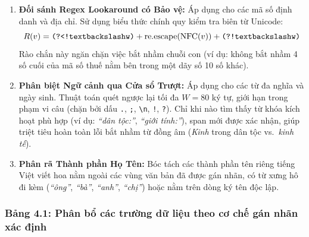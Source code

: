 \documentclass[
  11pt,
  a4paper,
]{article}
\providecommand{\tightlist}{%
  \setlength{\itemsep}{0pt}\setlength{\parskip}{0pt}}
\begin{document}
\begin{enumerate}
\def\labelenumi{\arabic{enumi}.}
\tightlist
\item
  \textbf{Đối sánh Regex Lookaround có Bảo vệ:} Áp dụng cho các mã số định danh và địa chỉ. Sử dụng
  biểu thức chính quy kiểm tra biên từ Unicode:
  \[R(v) = \texttt{(?<!\\textbackslash{}w)} + \text{re.escape}(\text{NFC}(v)) + \texttt{(?!\\textbackslash{}w)}\]
  Rào chắn này ngăn chặn việc bắt nhầm chuỗi con (ví dụ: không bắt nhầm 4 số cuối của mã số thuế nằm
  bên trong một dãy số 10 số khác).
\item
  \textbf{Phân biệt Ngữ cảnh qua Cửa sổ Trượt:} Áp dụng cho các từ đa nghĩa và ngày sinh. Thuật toán
  quét ngược lại tối đa \(W = 80\) ký tự, giới hạn trong phạm vi câu (chặn bởi dấu \texttt{.},
  \texttt{;}, \texttt{\textbackslash{}n}, \texttt{!}, \texttt{?}). Chỉ khi nào tìm thấy từ khóa kích
  hoạt phù hợp (ví dụ: \emph{``dân tộc:''}, \emph{``giới tính:''}), span mới được xác nhận, giúp
  triệt tiêu hoàn toàn lỗi bắt nhầm từ đồng âm (\emph{Kinh} trong dân tộc vs.~\emph{kinh tế}).
\item
  \textbf{Phân rã Thành phần Họ Tên:} Bóc tách các thành phần tên riêng tiếng Việt viết hoa nằm
  ngoài các vùng văn bản đã được gán nhãn, có từ xưng hô đi kèm (\emph{``ông''}, \emph{``bà''},
  \emph{``anh''}, \emph{``chị''}) hoặc nằm trên dòng ký tên độc lập.
\end{enumerate}

\subsubsection{Bảng 4.1: Phân bổ các trường dữ liệu theo cơ chế gán nhãn xác
định}\label{bux1ea3ng-4.1-phuxe2n-bux1ed5-cuxe1c-trux1b0ux1eddng-dux1eef-liux1ec7u-theo-cux1a1-chux1ebf-guxe1n-nhuxe3n-xuxe1c-ux111ux1ecbnh}
\end{document}
